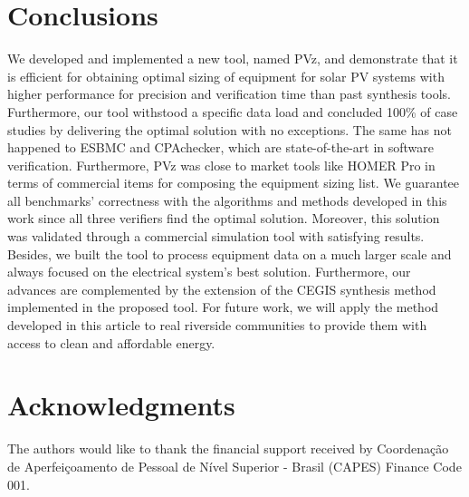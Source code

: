 \documentclass[review]{elsarticle}
\begin{document}
\section{Conclusions} 
\label{sec:Conclusions}
We developed and implemented a new tool, named PVz, and demonstrate that it is efficient for obtaining optimal sizing of equipment for solar PV systems with higher performance for precision and verification time than past synthesis tools. Furthermore, our tool withstood a specific data load and concluded 100\% of case studies by delivering the optimal solution with no exceptions. The same has not happened to ESBMC and CPAchecker, which are state-of-the-art in software verification. Furthermore, PVz was close to market tools like HOMER Pro in terms of commercial items for composing the equipment sizing list. We guarantee all benchmarks' correctness with the algorithms and methods developed in this work since all three verifiers find the optimal solution. Moreover, this solution was validated through a commercial simulation tool with satisfying results. Besides, we built the tool to process equipment data on a much larger scale and always focused on the electrical system's best solution. Furthermore, our advances are complemented by the extension of the CEGIS synthesis method implemented in the proposed tool. For future work, we will apply the method developed in this article to real riverside communities to provide them with access to clean and affordable energy.

\section*{Acknowledgments}
The authors would like to thank the financial support received by Coordenação de Aperfeiçoamento de Pessoal de Nível Superior - Brasil (CAPES) Finance Code 001.

%
%

%
%


%
\end{document}
